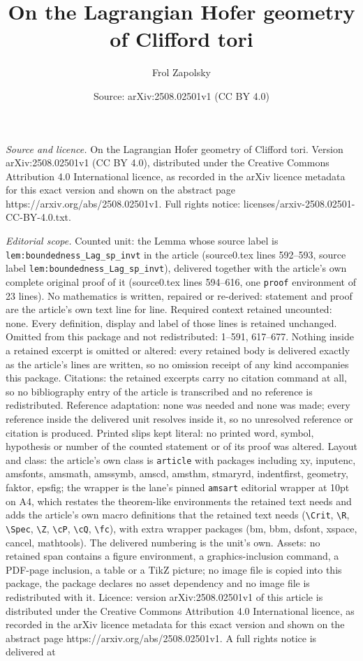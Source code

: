 \documentclass[10pt,a4paper]{amsart}
\title[On the Lagrangian Hofer geometry of Clifford tori]{On the Lagrangian Hofer geometry of Clifford tori}
\author{Frol Zapolsky}
\date{Source: arXiv:2508.02501v1 (CC BY 4.0)}
\begin{document}
\maketitle

\noindent\emph{Source and licence.} On the Lagrangian Hofer geometry of Clifford tori. Version arXiv:2508.02501v1 (CC BY 4.0), distributed under the Creative Commons Attribution 4.0 International licence, as recorded in the arXiv licence metadata for this exact version and shown on the abstract page https://arxiv.org/abs/2508.02501v1. Full rights notice: licenses/arxiv-2508.02501-CC-BY-4.0.txt.\par\smallskip

\noindent\textit{Editorial scope.} Counted unit: the Lemma whose source label is \texttt{lem:boundedness\_Lag\_sp\_invt} in the article (source0.tex lines 592--593, source label \texttt{lem:boundedness\_Lag\_sp\_invt}), delivered together with the article's own complete original proof of it (source0.tex lines 594--616, one \texttt{proof} environment of 23 lines). No mathematics is written, repaired or re-derived: statement and proof are the article's own text line for line. Required context retained uncounted: none. Every definition, display and label of those lines is retained unchanged. Omitted from this package and not redistributed: 1--591, 617--677. Nothing inside a retained excerpt is omitted or altered: every retained body is delivered exactly as the article's lines are written, so no omission receipt of any kind accompanies this package. Citations: the retained excerpts carry no citation command at all, so no bibliography entry of the article is transcribed and no reference is redistributed. Reference adaptation: none was needed and none was made; every reference inside the delivered unit resolves inside it, so no unresolved reference or citation is produced. Printed slips kept literal: no printed word, symbol, hypothesis or number of the counted statement or of its proof was altered. Layout and class: the article's own class is \texttt{article} with packages including xy, inputenc, amsfonts, amsmath, amssymb, amscd, amsthm, stmaryrd, indentfirst, geometry, faktor, epsfig; the wrapper is the lane's pinned \texttt{amsart} editorial wrapper at 10pt on A4, which restates the theorem-like environments the retained text needs and adds the article's own macro definitions that the retained text needs (\texttt{\textbackslash Crit}, \texttt{\textbackslash R}, \texttt{\textbackslash Spec}, \texttt{\textbackslash Z}, \texttt{\textbackslash cP}, \texttt{\textbackslash cQ}, \texttt{\textbackslash fc}), with extra wrapper packages (bm, bbm, dsfont, xspace, cancel, mathtools). The delivered numbering is the unit's own. Assets: no retained span contains a figure environment, a graphics-inclusion command, a PDF-page inclusion, a table or a TikZ picture; no image file is copied into this package, the package declares no asset dependency and no image file is redistributed with it. Licence: version arXiv:2508.02501v1 of this article is distributed under the Creative Commons Attribution 4.0 International licence, as recorded in the arXiv licence metadata for this exact version and shown on the abstract page https://arxiv.org/abs/2508.02501v1. A full rights notice is delivered at 
\end{document}
